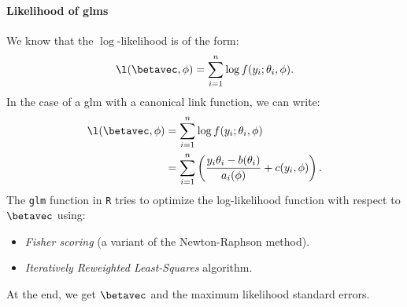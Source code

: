 \paragraph{Likelihood of \acsp{glm}}

We know that the $\log$-likelihood is of the form:
\begin{equation}
    \l(\betavec, \phi) = \sum_{i = 1}^n \log f(y_i; \theta_i, \phi).
\end{equation}
In the case of a \acs{glm} with a canonical link function, we can write:
\begin{equation}
    \begin{aligned}
        \l(\betavec, \phi) & = \sum_{i = 1}^n \log f(y_i; \theta_i, \phi)                                              \\
                           & = \sum_{i = 1}^n \left(\frac{y_i\theta_i - b(\theta_i)}{a_i(\phi)} + c(y_i, \phi)\right).
    \end{aligned}
\end{equation}
The \texttt{glm} function in \texttt{R} tries to optimize the log-likelihood function with respect to $\betavec$ using:
\begin{itemize}
    \item \emph{Fisher scoring} (a variant of the Newton-Raphson method).
    \item \emph{Iteratively Reweighted Least-Squares} algorithm.
\end{itemize}
At the end, we get $\betavec$ and the maximum likelihood standard errors.